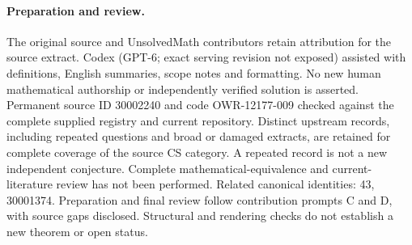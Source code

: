 \documentclass[11pt]{article}
\begin{document}
\paragraph{Preparation and review.}
The original source and UnsolvedMath contributors retain attribution for the source extract. Codex (GPT-6; exact serving revision not exposed) assisted with definitions, English summaries, scope notes and formatting. No new human mathematical authorship or independently verified solution is asserted. Permanent source ID 30002240 and code OWR-12177-009 checked against the complete supplied registry and current repository. Distinct upstream records, including repeated questions and broad or damaged extracts, are retained for complete coverage of the source CS category. A repeated record is not a new independent conjecture. Complete mathematical-equivalence and current-literature review has not been performed. Related canonical identities: 43, 30001374. Preparation and final review follow contribution prompts C and D, with source gaps disclosed. Structural and rendering checks do not establish a new theorem or open status.
\label{end:30002240}
\end{document}
